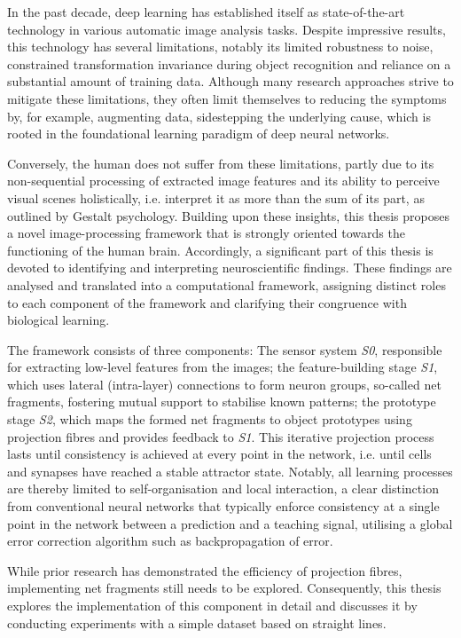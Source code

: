 In the past decade, deep learning has established itself as state-of-the-art technology in various automatic image analysis tasks.
Despite impressive results, this technology has several limitations, notably its limited robustness to noise, constrained transformation invariance during object recognition and reliance on a substantial amount of training data.
Although many research approaches strive to mitigate these limitations, they often limit themselves to reducing the symptoms by, for example, augmenting data, sidestepping the underlying cause, which is rooted in the foundational learning paradigm of deep neural networks.

Conversely, the human does not suffer from these limitations, partly due to its non-sequential processing of extracted image features and its ability to perceive visual scenes holistically, i.e. interpret it as more than the sum of its part, as outlined by Gestalt psychology.
Building upon these insights, this thesis proposes a novel image-processing framework that is strongly oriented towards the functioning of the human brain.
Accordingly, a significant part of this thesis is devoted to identifying and interpreting neuroscientific findings.
These findings are analysed and translated into a computational framework, assigning distinct roles to each component of the framework and clarifying their congruence with biological learning.

The framework consists of three components: The sensor system \emph{S0},  responsible for extracting low-level features from the images; the feature-building stage \emph{S1}, which uses lateral (intra-layer) connections to form neuron groups, so-called net fragments,  fostering mutual support to stabilise known patterns; the prototype stage \emph{S2}, which maps the formed net fragments to object prototypes using projection fibres and provides feedback to \emph{S1}.
This iterative projection process lasts until consistency is achieved at every point in the network, i.e. until cells and synapses have reached a stable attractor state.
Notably, all learning processes are thereby limited to self-organisation and local interaction, a clear distinction from conventional neural networks that typically enforce consistency at a single point in the network between a prediction and a teaching signal, utilising a global error correction algorithm such as backpropagation of error.

While prior research has demonstrated the efficiency of projection fibres, implementing net fragments still needs to be explored.
Consequently, this thesis explores the implementation of this component in detail and discusses it by conducting experiments with a simple dataset based on straight lines.

